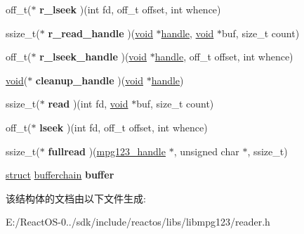 \begin{DoxyCompactItemize}
off\+\_\+t($\ast$ {\bfseries r\+\_\+lseek} )(int fd, off\+\_\+t offset, int whence)
\item 
\mbox{\label{structreader__data_a0e75fa58fb225b3962e7c027d49857c0}} 
ssize\+\_\+t($\ast$ {\bfseries r\+\_\+read\+\_\+handle} )(\hyperlink{interfacevoid}{void} $\ast$\hyperlink{structhandle}{handle}, \hyperlink{interfacevoid}{void} $\ast$buf, size\+\_\+t count)
\item 
\mbox{\label{structreader__data_af30327c3d0569f13b5d988a380d4d784}} 
off\+\_\+t($\ast$ {\bfseries r\+\_\+lseek\+\_\+handle} )(\hyperlink{interfacevoid}{void} $\ast$\hyperlink{structhandle}{handle}, off\+\_\+t offset, int whence)
\item 
\mbox{\label{structreader__data_ae10623dddb84c17a3d69c040a4cb197f}} 
\hyperlink{interfacevoid}{void}($\ast$ {\bfseries cleanup\+\_\+handle} )(\hyperlink{interfacevoid}{void} $\ast$\hyperlink{structhandle}{handle})
\item 
\mbox{\label{structreader__data_a6c02befde56bb496dd7c6ef054b5f4c9}} 
ssize\+\_\+t($\ast$ {\bfseries read} )(int fd, \hyperlink{interfacevoid}{void} $\ast$buf, size\+\_\+t count)
\item 
\mbox{\label{structreader__data_aca92bc37e7646f7b8c30500cdc71357d}} 
off\+\_\+t($\ast$ {\bfseries lseek} )(int fd, off\+\_\+t offset, int whence)
\item 
\mbox{\label{structreader__data_a757d5cfcd9281bda852d6c7c6d168390}} 
ssize\+\_\+t($\ast$ {\bfseries fullread} )(\hyperlink{group__mpg123__init_ga6728e2839a395f3a07d4514da659faca}{mpg123\+\_\+handle} $\ast$, unsigned char $\ast$, ssize\+\_\+t)
\item 
\mbox{\label{structreader__data_a4066b6dbdd697a8adff08add430a812d}} 
\hyperlink{interfacestruct}{struct} \hyperlink{structbufferchain}{bufferchain} {\bfseries buffer}
\end{DoxyCompactItemize}


该结构体的文档由以下文件生成\+:\begin{DoxyCompactItemize}
\item 
E\+:/\+React\+O\+S-\/0../sdk/include/reactos/libs/libmpg123/reader.\+h\end{DoxyCompactItemize}

